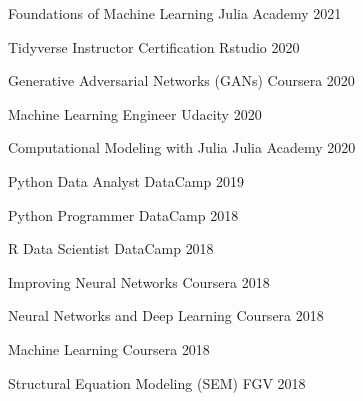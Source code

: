 

\begin{cvhonors}


  \cvhonor
    {Foundations of Machine Learning} %
    {} %
    {Julia Academy} %
    {2021} %

  \cvhonor
    {Tidyverse Instructor Certification} %
    {} %
    {Rstudio} %
    {2020} %

  \cvhonor
    {Generative Adversarial Networks (GANs)} %
    {} %
    {Coursera} %
    {2020} %

  \cvhonor
    {Machine Learning Engineer} %
    {} %
    {Udacity} %
    {2020} %

  \cvhonor
    {Computational Modeling with Julia} %
    {} %
    {Julia Academy} %
    {2020} %

  \cvhonor
    {Python Data Analyst} %
    {} %
    {DataCamp} %
    {2019} %

  \cvhonor
    {Python Programmer} %
    {} %
    {DataCamp} %
    {2018} %

  \cvhonor
    {R Data Scientist} %
    {} %
    {DataCamp} %
    {2018} %

  \cvhonor
    {Improving Neural Networks} %
    {} %
    {Coursera} %
    {2018} %

  \cvhonor
    {Neural Networks and Deep Learning} %
    {} %
    {Coursera} %
    {2018} %

  \cvhonor
    {Machine Learning} %
    {} %
    {Coursera} %
    {2018} %

  \cvhonor
    {Structural Equation Modeling (SEM)} %
    {} %
    {FGV} %
    {2018} %

\end{cvhonors}
